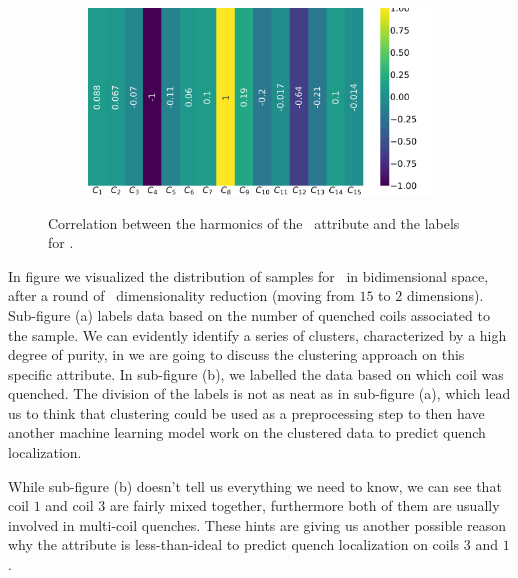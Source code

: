 \begin{figure}[!ht]
\begin{subfigure}{0.49\linewidth}
	\end{subfigure}
	\begin{subfigure}{0.49\linewidth}
		\includegraphics[width=\linewidth]{img/qlp_corr/An_coil3.png}
	\end{subfigure}
	\caption{Correlation between the harmonics of the \an\ attribute and the labels for \qlp.}
	\label{fig:an-lcorr-qlp}
\end{figure}

In figure  we visualized the distribution of samples for \an\ in
bidimensional space, after a round of \pca\ dimensionality reduction (moving from $15$ to $2$
dimensions). Sub-figure (a) labels data based on the number of quenched coils associated to the
sample. We can evidently identify a series of clusters, characterized by a high degree of purity, in
 we are going to discuss the clustering approach on this specific attribute.
In sub-figure (b), we labelled the data based on which coil was quenched. The division of the labels
is not as neat as in sub-figure (a), which lead us to think that clustering could be used as a
preprocessing step to then have another machine learning model work on the clustered data to
predict quench localization.

While sub-figure (b) doesn't tell us everything we need to know, we can see that coil $1$ and coil
$3$ are fairly mixed together, furthermore both of them are usually involved in multi-coil quenches.
These hints are giving us another possible reason why the attribute is less-than-ideal to
predict quench localization on coils $3$ and $1$ .

